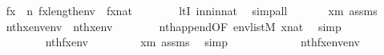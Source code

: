 \begin{isabellebody}
\ \ \ \ \isamarkupfalse%
\ {\isachardoublequoteopen}f{\isacharbackquote}{\kern0pt}x\ {\isacharless}{\kern0pt}\ n{\isachardoublequoteclose}\ {\isachardoublequoteopen}f{\isacharbackquote}{\kern0pt}x{\isacharless}{\kern0pt}length{\isacharparenleft}{\kern0pt}env{\isacharprime}{\kern0pt}{\isacharparenright}{\kern0pt}{\isachardoublequoteclose}\ \ {\isachardoublequoteopen}f{\isacharbackquote}{\kern0pt}x{\isasymin}nat{\isachardoublequoteclose}\isanewline
\ \ \ \ \ \ \isamarkupfalse%
\ ltI\ in{\isacharunderscore}{\kern0pt}n{\isacharunderscore}{\kern0pt}in{\isacharunderscore}{\kern0pt}nat\ \isamarkupfalse%
\ simp{\isacharunderscore}{\kern0pt}all\isanewline
\ \ \ \ \isamarkupfalse%
\ {}\ {\isacartoucheopen}x{\isacharless}{\kern0pt}m{\isacartoucheclose}\ assms\isanewline
\ \ \ \ \isamarkupfalse%
\ {\isachardoublequoteopen}nth{\isacharparenleft}{\kern0pt}x{\isacharcomma}{\kern0pt}env{\isacharat}{\kern0pt}env{}{\isacharparenright}{\kern0pt}\ {\isacharequal}{\kern0pt}\ nth{\isacharparenleft}{\kern0pt}x{\isacharcomma}{\kern0pt}env{\isacharparenright}{\kern0pt}{\isachardoublequoteclose}\isanewline
\ \ \ \ \ \ \isamarkupfalse%
\ nth{\isacharunderscore}{\kern0pt}append{\isacharbrackleft}{\kern0pt}OF\ {\isacartoucheopen}env{\isasymin}list{\isacharparenleft}{\kern0pt}M{\isacharparenright}{\kern0pt}{\isacartoucheclose}{\isacharbrackright}{\kern0pt}\ {\isacartoucheopen}x{\isasymin}nat{\isacartoucheclose}\ \isamarkupfalse%
\ simp\isanewline
\ \ \ \ \isamarkupfalse%
\isanewline
\ \ \ \ \isamarkupfalse%
\isanewline
\ \ \ \ \ \ {\isachardoublequoteopen}{\isachardot}{\kern0pt}{\isachardot}{\kern0pt}{\isachardot}{\kern0pt}\ {\isacharequal}{\kern0pt}\ nth{\isacharparenleft}{\kern0pt}f{\isacharbackquote}{\kern0pt}x{\isacharcomma}{\kern0pt}env{\isacharprime}{\kern0pt}{\isacharparenright}{\kern0pt}{\isachardoublequoteclose}\isanewline
\ \ \ \ \ \ \isamarkupfalse%
\ {}\ {\isacartoucheopen}x{\isacharless}{\kern0pt}m{\isacartoucheclose}\ assms\ \isamarkupfalse%
\ simp\isanewline
\ \ \ \ \isamarkupfalse%
\isanewline
\ \ \ \ \isamarkupfalse%
\ {\isachardoublequoteopen}{\isachardot}{\kern0pt}{\isachardot}{\kern0pt}{\isachardot}{\kern0pt}\ {\isacharequal}{\kern0pt}\ nth{\isacharparenleft}{\kern0pt}f{\isacharbackquote}{\kern0pt}x{\isacharcomma}{\kern0pt}env{\isacharprime}{\kern0pt}{\isacharat}{\kern0pt}env{}{\isacharparenright}{\kern0pt}{\isachardoublequoteclose}\isanewline

\end{isabellebody}
